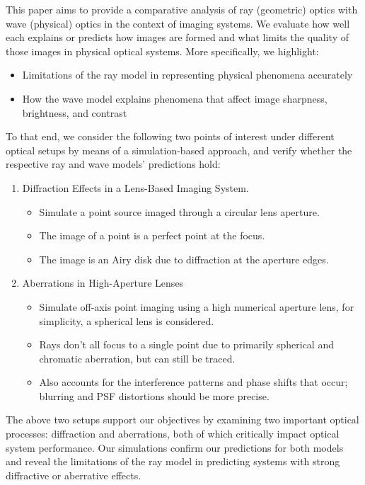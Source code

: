 This paper aims to provide a comparative analysis of ray (geometric) optics with wave (physical) optics in the context of 
imaging systems. We evaluate how well each explains or predicts how images are formed and what limits the quality of those images in physical optical systems.   
More specifically, we highlight: 
\begin{itemize}
    \item Limitations of the ray model in representing physical phenomena accurately
    \item How the wave model explains phenomena that affect image sharpness, brightness, and contrast
\end{itemize}
To that end, we consider the following two points of interest under different optical setups by means of a simulation-based approach, and verify
whether the respective ray and wave models' predictions hold:  
\begin{enumerate} 
    \item Diffraction Effects in a Lens-Based Imaging System.
        \begin{itemize}
            \item {} Simulate a point source imaged through a circular lens aperture. 
            \item {} The image of a point is a perfect point at the focus.
            \item {} The image is an Airy disk due to diffraction at the aperture edges.
        \end{itemize}
    \item Aberrations in High-Aperture Lenses
        \begin{itemize}
            \item {} Simulate off-axis point imaging using a high numerical aperture lens, for simplicity, a spherical lens is considered. 
            \item {} Rays don't all focus to a single point due to primarily spherical and chromatic aberration, but can still be traced.
            \item {} Also accounts for the interference patterns and phase shifts that occur; blurring and PSF distortions should be more precise. 
        \end{itemize}
\end{enumerate}
The above two setups support our objectives by examining two important optical processes: diffraction and aberrations, both of which critically impact optical system performance. Our simulations confirm 
our predictions for both models and reveal the limitations of the ray model in predicting systems with strong diffractive or aberrative effects.   



